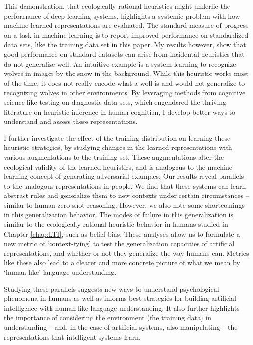 This demonstration, that ecologically rational heuristics might underlie the performance of deep-learning systems, highlights a systemic problem with how machine-learned representations are evaluated. The standard measure of progress on a task in machine learning is to report improved performance on standardized data sets, like the training data set in this paper. My results however, show that good performance on standard datasets can arise from incidental heuristics that do not generalize well. An intuitive example is a system learning to recognize wolves in images by the snow in the background. While this heuristic works most of the time, it does not really encode what a wolf is and would not generalize to recognizing wolves in other environments. By leveraging methods from cognitive science like testing on diagnostic data sets, which engendered the thriving literature on heuristic inference in human cognition, I develop better ways to understand and assess these representations.

I further investigate the effect of the training distribution on learning these heuristic strategies, by studying changes in the learned representations with various augmentations to the training set. These augmentations alter the ecological validity of the learned heuristics, and is analogous to the machine-learning concept of generating adversarial examples. \cite{goodfellow2014explaining} Our results reveal parallels to the analogous representations in people. We find that these systems can learn abstract rules and generalize them to new contexts under certain circumstances -- similar to human zero-shot reasoning. However, we also note some shortcomings in this generalization behavior. The modes of failure in this generalization is similar to the ecologically rational heuristic behavior in humans studied in Chapter \ref{chap:LTI}, such as belief bias. These analyses allow us to formulate a new metric of `context-tying' to test the generalization capacities of artificial representations, and whether or not they generalize the way humans can. Metrics like these also lead to a clearer and more concrete picture of what we mean by `human-like' language understanding. 

Studying these parallels suggests new ways to understand psychological phenomena in humans as well as informs best strategies for building artificial intelligence with human-like language understanding. It also further highlights the importance of considering the environment (the training data) in understanding – and, in the case of artificial systems, also manipulating – the representations that intelligent systems learn. 

